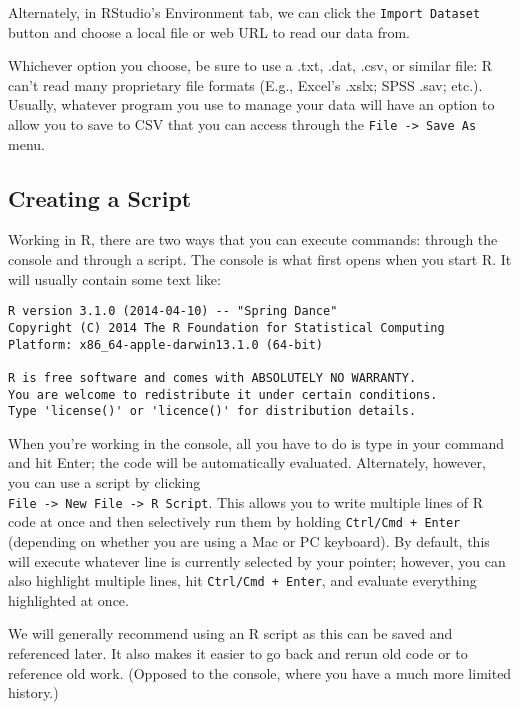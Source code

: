 Alternately, in RStudio's Environment tab, we can click the \verb|Import Dataset| button and choose a local file or web URL to read our data from.

Whichever option you choose, be sure to use a .txt, .dat, .csv, or similar file: R can't read many proprietary file formats (E.g., Excel's .xslx; SPSS .sav; etc.). Usually, whatever program you use to manage your data will have an option to allow you to save to CSV that you can access through the \verb|File -> Save As| menu.

\subsection{Creating a Script}
Working in R, there are two ways that you can execute commands: through the console and through a script. The console is what first opens when you start R. It will usually contain some text like:

\begin{framed}
\begin{Verbatim}[samepage=TRUE]
R version 3.1.0 (2014-04-10) -- "Spring Dance"
Copyright (C) 2014 The R Foundation for Statistical Computing
Platform: x86_64-apple-darwin13.1.0 (64-bit)
 
R is free software and comes with ABSOLUTELY NO WARRANTY.
You are welcome to redistribute it under certain conditions.
Type 'license()' or 'licence()' for distribution details.
\end{Verbatim}
\end{framed}

When you're working in the console, all you have to do is type in your command and hit Enter; the code will be automatically evaluated. Alternately, however, you can use a script by clicking \\ \verb|File -> New File -> R Script|. This allows you to write multiple lines of R code at once and then selectively run them by holding \verb|Ctrl/Cmd + Enter| (depending on whether you are using a Mac or PC keyboard). By default, this will execute whatever line is currently selected by your pointer; however, you can also highlight multiple lines, hit \verb|Ctrl/Cmd + Enter|, and evaluate everything highlighted at once.

We will generally recommend using an R script as this can be saved and referenced later. It also makes it easier to go back and rerun old code or to reference old work. (Opposed to the console, where you have a much more limited history.)

